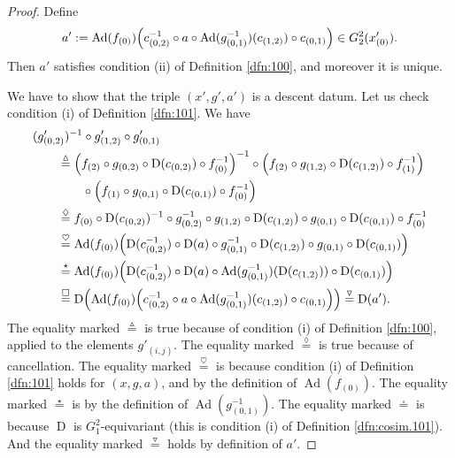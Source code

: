 \documentclass[a4paper,10pt]{amsart}
\theoremstyle{definition}
\numberwithin{equation}{section}
\newcommand{\opn}{\operatorname}
\begin{document}
\begin{proof}
Define 
\[ a' := \opn{Ad}(f_{(0)}) \Bigl( 
c_{(0, 2)}^{-1} \circ a \circ \opn{Ad}(g_{(0, 1)}^{-1})(c_{(1, 2)})
\circ c_{(0, 1)}  \Bigr) \in G^2_2(x'_{(0)}) . \]
Then $a'$ satisfies condition (ii) of Definition \ref{dfn:100}, and moreover it
is unique. 

We have to show that the triple $(x', g', a')$ is a descent
datum. Let us check condition (i) of Definition \ref{dfn:101}. We have 
\[ \begin{aligned}
& (g'_{(0, 2)})^{-1} \circ g'_{(1, 2)} \circ g'_{(0, 1)}
\\
& \qquad  \overset{\vartriangle}{=} \Bigl( f_{(2)} \circ g_{(0, 2)} \circ 
\opn{D}(c_{(0, 2)}) \circ f_{(0)}^{-1} \Bigr)^{-1} 
\circ \Bigl( f_{(2)} \circ g_{(1, 2)} \circ  \opn{D}(c_{(1, 2)}) 
\circ f_{(1)}^{-1} \Bigr)
\\
& \qquad \qquad \circ \Bigl( f_{(1)} \circ g_{(0, 1)} \circ  
\opn{D}(c_{(0, 1)}) \circ f_{(0)}^{-1} \Bigr)
\\
& \qquad \overset{\lozenge}{=} f_{(0)} \circ \opn{D}(c_{(0, 2)})^{-1}
\circ  
g_{(0, 2)}^{-1} \circ g_{(1, 2)} \circ \opn{D}(c_{(1, 2)})
\circ g_{(0, 1)} \circ \opn{D}(c_{(0, 1)}) \circ f_{(0)}^{-1}
\\
& \qquad \overset{\heartsuit}{=} \opn{Ad}(f_{(0)}) \Bigl( 
\opn{D}(c_{(0, 2)}^{-1}) \circ 
\opn{D}(a) \circ g_{(0, 1)}^{-1} \circ \opn{D}(c_{(1, 2)})
\circ g_{(0, 1)} \circ \opn{D}(c_{(0, 1)}) \Bigr) 
\\
& \qquad \overset{\star}{=} \opn{Ad}(f_{(0)}) \Bigl( 
\opn{D}(c_{(0, 2)}^{-1}) \circ 
\opn{D}(a) \circ \opn{Ad}(g_{(0, 1)}^{-1})(\opn{D}(c_{(1, 2)})) 
\circ \opn{D}(c_{(0, 1)}) \Bigr) 
\\
& \qquad \overset{\square}{=} \opn{D} \Bigl( \opn{Ad}(f_{(0)}) \Bigl( 
c_{(0, 2)}^{-1} \circ a \circ \opn{Ad}(g_{(0, 1)}^{-1})(c_{(1, 2)})
\circ c_{(0, 1)} \Bigr) \Bigr) 
\overset{\triangledown}{=} \opn{D}(a') . 
\end{aligned} \]
The equality marked $\overset{\vartriangle}{=}$ is true because of  
condition (i) of Definition \ref{dfn:100}, applied to the elements 
$g'_{(i, j)}$. The equality marked $\overset{\lozenge}{=}$ is true because of
cancellation. The equality marked $\overset{\heartsuit}{=}$ is because 
condition (i) of Definition \ref{dfn:101} holds for $(x, g, a)$, and by the
definition of $\opn{Ad}(f_{(0)})$. 
The equality marked $\overset{\star}{=}$ is by the
definition of $\opn{Ad}(g_{(0,1)}^{-1})$. 
The equality marked $\overset{\square}{=}$ is because $\opn{D}$ is 
$G^2_1$-equivariant
(this is condition (i) of Definition \ref{dfn:cosim.101}).
And the equality marked $\overset{\triangledown}{=}$ holds by definition of 
$a'$.


\end{proof}
\end{document}
